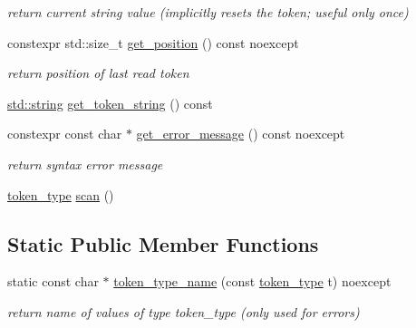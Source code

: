 \begin{DoxyCompactItemize}
\begin{DoxyCompactList}\small\item\em return current string value (implicitly resets the token; useful only once) \end{DoxyCompactList}\item 
constexpr std\+::size\+\_\+t \hyperlink{classnlohmann_1_1detail_1_1lexer_a2a00465a3d5d70c84809cdb27658db79}{get\+\_\+position} () const noexcept
\begin{DoxyCompactList}\small\item\em return position of last read token \end{DoxyCompactList}\item 
\hyperlink{namespacenlohmann_1_1detail_a1ed8fc6239da25abcaf681d30ace4985ab45cffe084dd3d20d928bee85e7b0f21}{std\+::string} \hyperlink{classnlohmann_1_1detail_1_1lexer_a4aef7e72e539be04e139c34872421f2a}{get\+\_\+token\+\_\+string} () const
\item 
constexpr const char $\ast$ \hyperlink{classnlohmann_1_1detail_1_1lexer_a53cebbc684ef97fa49651eb442d58f86}{get\+\_\+error\+\_\+message} () const noexcept
\begin{DoxyCompactList}\small\item\em return syntax error message \end{DoxyCompactList}\item 
\hyperlink{classnlohmann_1_1detail_1_1lexer_a3f313cdbe187cababfc5e06f0b69b098}{token\+\_\+type} \hyperlink{classnlohmann_1_1detail_1_1lexer_aac3041cd2b9291e64fee38db422863c9}{scan} ()
\end{DoxyCompactItemize}
\subsection*{Static Public Member Functions}
\begin{DoxyCompactItemize}
\item 
static const char $\ast$ \hyperlink{classnlohmann_1_1detail_1_1lexer_ae514e2005f0ce185f1ad366139e541e8}{token\+\_\+type\+\_\+name} (const \hyperlink{classnlohmann_1_1detail_1_1lexer_a3f313cdbe187cababfc5e06f0b69b098}{token\+\_\+type} t) noexcept
\begin{DoxyCompactList}\small\item\em return name of values of type token\+\_\+type (only used for errors) \end{DoxyCompactList}\end{DoxyCompactItemize}
